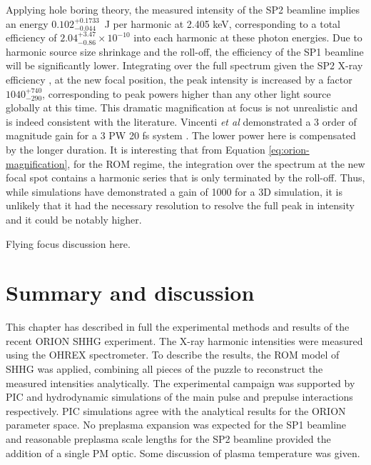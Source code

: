 Applying hole boring theory, the measured intensity of the SP2 beamline implies an energy $0.102_{ - 0.044}^{ + 0.1733}$\unit{\mu J} per harmonic at 2.405 keV, corresponding to a total efficiency of $2.04_{ - 0.86}^{ + 3.47}\times 10^{-10}$ into each harmonic at these photon energies. Due to harmonic source size shrinkage and the roll-off, the efficiency of the SP1 beamline will be significantly lower. Integrating over the full spectrum given the SP2 X-ray efficiency \cite{gordienkoCoherentFocusingHigh2005}, at the new focal position, the peak intensity is increased by a factor $1040^{+ 740}_{ - 290}$, corresponding to peak powers higher than any other light source globally at this time. This dramatic magnification at focus is not unrealistic and is indeed consistent with the literature. Vincenti \textit{et al} demonstrated a 3 order of magnitude gain for a 3 PW 20 fs system \cite{vincentiAchievingExtremeLight2019}. The lower power here is compensated by the longer duration. It is interesting that from Equation \ref{eq:orion-magnification}, for the ROM regime, the integration over the spectrum at the new focal spot contains a harmonic series that is only terminated by the roll-off. Thus, while simulations have demonstrated a gain of 1000 for a 3D simulation, it is unlikely that it had the necessary resolution to resolve the full peak in intensity and it could be notably higher.


Flying focus discussion here.


\section{ \label{ch:3-sec:conclusion}Summary and discussion}
This chapter has described in full the experimental methods and results of the recent ORION SHHG experiment. The X-ray harmonic intensities were measured using the OHREX spectrometer. To describe the results, the ROM model of SHHG was applied, combining all pieces of the puzzle to reconstruct the measured intensities analytically. The experimental campaign was supported by PIC and hydrodynamic simulations of the main pulse and prepulse interactions respectively. PIC simulations agree with the analytical results for the ORION parameter space. No preplasma expansion was expected for the SP1 beamline and reasonable preplasma scale lengths for the SP2 beamline provided the addition of a single PM optic. Some discussion of plasma temperature was given.

